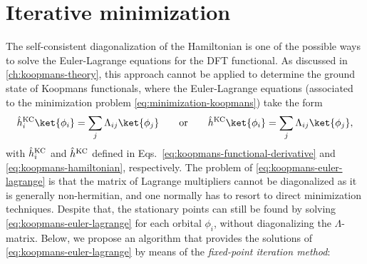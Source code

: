 \chapter{Iterative minimization\label{app:iterative-minimization}}

The self-consistent diagonalization of the Hamiltonian is one of the possible ways to solve the Euler-Lagrange equations for the DFT functional. As discussed in \cref{ch:koopmans-theory}, this approach cannot be applied to determine the ground state of Koopmans functionals, where the Euler-Lagrange equations (associated to the minimization problem \eqref{eq:minimization-koopmans}) take the form
%
\begin{equation}
    \hat{h}^{\rm KC}_i \ket{\phi_i} = \sum_j \Lambda_{ij} \ket{\phi_j} \qquad \text{or} \qquad
    \hat{h}^{\rm KC} \ket{\phi_i} = \sum_j \Lambda_{ij} \ket{\phi_j} ,
    \label{eq:koopmans-euler-lagrange}
\end{equation}
%
with $\hat{h}^{\rm KC}_i$ and $\hat{h}^{\rm KC}$ defined in Eqs.~\eqref{eq:koopmans-functional-derivative} and \eqref{eq:koopmans-hamiltonian}, respectively. The problem of \cref{eq:koopmans-euler-lagrange} is that the matrix of Lagrange multipliers cannot be diagonalized as it is generally non-hermitian, and one normally has to resort to direct minimization techniques. Despite that, the stationary points can still be found by solving \cref{eq:koopmans-euler-lagrange} for each orbital $\phi_i$, without diagonalizing the $\Lambda$-matrix. Below, we propose an algorithm that provides the solutions of \cref{eq:koopmans-euler-lagrange} by means of the \emph{fixed-point iteration method}:
%
